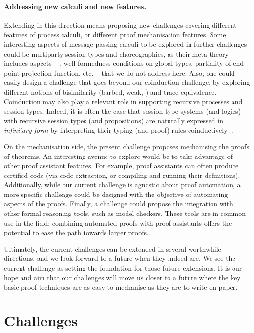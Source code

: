 \documentclass[runningheads]{llncs}
\begin{document}
\paragraph{Addressing new calculi and new features.}
Extending in this direction means proposing new challenges covering different features of process calculi, or different proof mechanisation features.
Some interesting aspects of message-passing calculi to be explored in further challenges could be multiparty session types and choreographies, as their meta-theory includes aspects -- \eg, well-formedness conditions on global types, partiality of end-point projection function, etc. -- that we do not address here.
Also, one could easily design a challenge that goes beyond our coinduction challenge, by exploring different notions of bisimilarity (barbed, weak, \etc) and trace equivalence.
%
Coinduction may also play a relevant role in supporting recursive processes and
session types. Indeed, it is often the case that session type systems (and
logics) with recursive session types (and propositions) are naturally expressed
in \emph{infinitary form} by interpreting their typing (and proof) rules
coinductively~\cite{BaeldeDoumaneSaurin16,DerakhshanPfenning22,HornePadovani23}.

On the mechanisation side, the present challenge proposes mechanising the proofs of theorems.
An interesting avenue to explore would be to take advantage of other proof assistant features.
For example, proof assistants can often produce certified code (via code extraction, or compiling and running their definitions).
Additionally, while our current challenge is agnostic about proof automation, a more specific challenge could be designed with the objective of automating aspects of the proofs.
Finally, a challenge could propose the integration with other formal reasoning tools, such as model checkers.
These tools are in common use in the field; combining automated proofs with proof assistants offers the potential to ease the path towards larger proofs.

Ultimately, the current challenges can be extended in several worthwhile directions, and we look forward to a future when they indeed are.
We see the current challenge as setting the foundation for those future extensions.
It is our hope and aim that our challenges will move us closer to a future where the key basic proof techniques are as easy to mechanise as they are to write on paper.




\clearpage
\appendix
\section{Challenges}\label{app:challenges}

\end{document}
